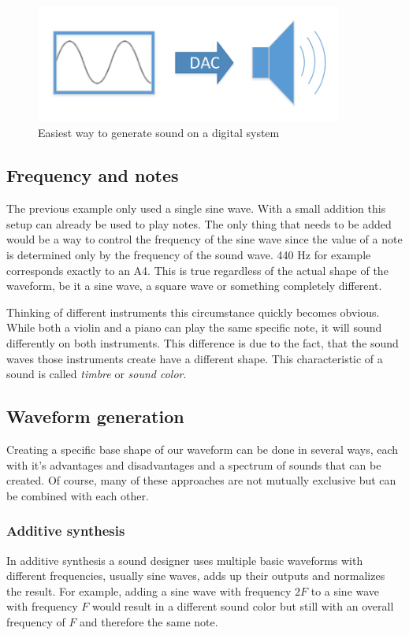 	  	\begin{figure}[!h]
		\centering
			\includegraphics[width=0.90\textwidth]{images/sound_generation.pdf}
		\caption{Easiest way to generate sound on a digital system }
		\label{fig:sound_generation}
		\end{figure}
		
		\subsection{Frequency and notes}
		The previous example only used a single sine wave. 
		With a small addition this setup can already be used to play notes.
		The only thing that needs to be added would be a way to control the frequency of the sine wave since the value of a note is determined only by the frequency of the sound wave. 
		440 Hz for example corresponds exactly to an A4.
		This is true regardless of the actual shape of the waveform, be it a sine wave, a square wave or something completely different. 

		Thinking of different instruments this circumstance quickly becomes obvious. 
		While both a violin and a piano can play the same specific note, it will sound differently on both instruments.
		This difference is due to the fact, that the sound waves those instruments create have a different shape.
		This characteristic of a sound is called \emph{timbre} or \emph{sound color}.
		
		\subsection{Waveform generation}
		Creating a specific base shape of our waveform can be done in several ways, each with it's advantages and disadvantages and a spectrum of sounds that can be created.
		Of course, many of these approaches are not mutually exclusive but can be combined with each other.
			\subsubsection{Additive synthesis}
				In additive synthesis a sound designer uses multiple basic waveforms with different frequencies, usually sine waves, adds up their outputs and normalizes the result.
				For example, adding a sine wave with frequency $2F$ to a sine wave with frequency $F$ would result in a different sound color but still with an overall frequency of $F$ and therefore the same note.
				
